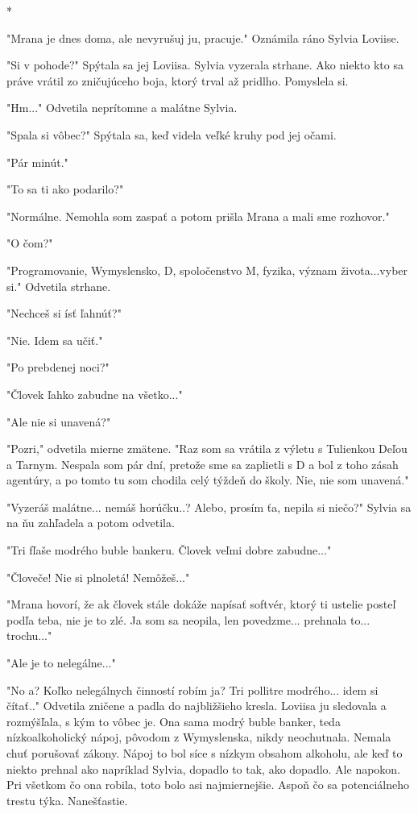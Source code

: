 \documentclass{book}
\begin{document}
\begin{center}

*

\end{center}

"$ $Mrana je dnes doma, ale nevyrušuj ju, pracuje."$ $  Oznámila ráno Sylvia Loviise.

"$ $Si v pohode?"$ $  Spýtala sa jej Loviisa. Sylvia vyzerala strhane. Ako niekto kto sa práve vrátil zo zničujúceho boja, ktorý trval až pridlho. Pomyslela si.

"$ $Hm..."$ $  Odvetila neprítomne a malátne Sylvia.

"$ $Spala si vôbec?"$ $  Spýtala sa, keď videla veľké kruhy pod jej očami.

"$ $Pár minút."$ $ 

"$ $To sa ti ako podarilo?"$ $ 

"$ $Normálne. Nemohla som zaspať a potom prišla Mrana a mali sme rozhovor."$ $ 

"$ $O čom?"$ $ 

"$ $Programovanie, Wymyslensko, D, spoločenstvo M, fyzika, význam života...vyber si."$ $  Odvetila strhane.

"$ $Nechceš si ísť ľahnúť?"$ $ 

"$ $Nie. Idem sa učiť."$ $ 

"$ $Po prebdenej noci?"$ $ 

"$ $Človek ľahko zabudne na všetko..."$ $ 

"$ $Ale nie si unavená?"$ $ 

"$ $Pozri,"$ $  odvetila mierne zmätene. "$ $Raz som sa vrátila z výletu s Tulienkou Deľou a Tarnym. Nespala som pár dní, pretože sme sa zaplietli s D a bol z toho zásah agentúry, a po tomto tu som chodila celý týždeň do školy. Nie, nie som unavená."$ $ 

"$ $Vyzeráš malátne... nemáš horúčku..? Alebo, prosím ťa, nepila si niečo?"$ $  Sylvia sa na ňu zahľadela a potom odvetila.

"$ $Tri fľaše modrého buble bankeru. Človek veľmi dobre zabudne..."$ $ 

"$ $Človeče! Nie si plnoletá! Nemôžeš..."$ $ 

"$ $Mrana hovorí, že ak človek stále dokáže napísať softvér, ktorý ti ustelie posteľ podľa teba, nie je to zlé. Ja som sa neopila, len povedzme... prehnala to... trochu..."$ $ 

"$ $Ale je to nelegálne..."$ $ 

"$ $No a? Koľko nelegálnych činností robím ja? Tri pollitre modrého... idem si čítať.."$ $  Odvetila zničene a padla do najbližšieho kresla. Loviisa ju sledovala a rozmýšľala, s kým to vôbec je. Ona sama modrý buble banker, teda nízkoalkoholický nápoj, pôvodom z Wymyslenska, nikdy neochutnala. Nemala chuť porušovať zákony. Nápoj to bol síce s nízkym obsahom alkoholu, ale keď to niekto prehnal ako napríklad Sylvia, dopadlo to tak, ako dopadlo. Ale napokon. Pri všetkom čo ona robila, toto bolo asi najmiernejšie. Aspoň čo sa potenciálneho trestu týka. Nanešťastie.
\end{document}
